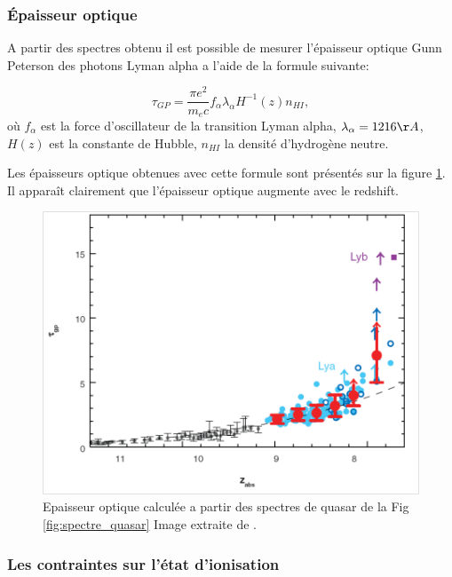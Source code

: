 \subsubsection{Épaisseur optique}

A partir des spectres obtenu il est possible de mesurer l’épaisseur optique Gunn Peterson \cite{1965ApJ...141.1295S} des photons Lyman alpha a l'aide de la formule suivante:

\begin{equation}
\tau_{GP} = \frac{\pi e^2}{m_e c} f_\alpha \lambda_\alpha H^{-1}(z) n_{HI},
\end{equation}
où $f_\alpha$ est la force d'oscillateur de la transition Lyman alpha, $\lambda_\alpha = 1216 \AA$, $H(z)$ est la constante de Hubble, $n_{HI}$ la densité d'hydrogène neutre.

Les épaisseurs optique obtenues avec cette formule sont présentés sur la figure \ref{fig:epaisseur_optique_quasar}.
Il apparaît clairement que l'épaisseur optique augmente avec le redshift.

\begin{figure}[bth]
        \includegraphics[width=.95\linewidth]{img/01/epaisseur_optique_quasar.png} 
        \caption{%
		Epaisseur optique calculée a partir des spectres de quasar de la Fig\,\ref{fig:spectre_quasar}
        Image extraite de \cite{fan_constraining_2006}.}
 		\label{fig:epaisseur_optique_quasar}
\end{figure}

\subsubsection{Les contraintes sur l'état d'ionisation}

